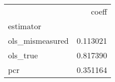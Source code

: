 \begin{tabular}{lr}
\toprule
{} &     coeff \\
estimator       &           \\
\midrule
ols\_mismeasured &  0.113021 \\
ols\_true        &  0.817390 \\
pcr             &  0.351164 \\
\bottomrule
\end{tabular}
